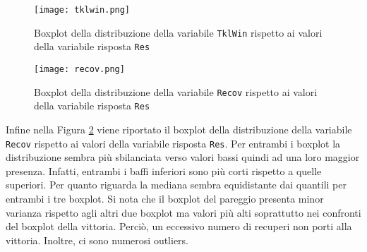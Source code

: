 \begin{figure}[htbp]
	\begin{center}
		\texttt{[image: tklwin.png]}
		\caption{Boxplot della distribuzione della variabile \texttt{TklWin} rispetto ai valori della variabile risposta \texttt{Res}} \label{fig:tkl}
	\end{center}
\end{figure}
\begin{figure}[htbp]
	\begin{center}
		\texttt{[image: recov.png]}
		\caption{Boxplot della distribuzione della variabile \texttt{Recov} rispetto ai valori della variabile risposta \texttt{Res}} \label{fig:recov}
	\end{center}
\end{figure} 
Infine nella Figura \ref{fig:recov} viene riportato il boxplot della distribuzione della variabile \texttt{Recov} rispetto ai valori della variabile risposta \texttt{Res}. Per entrambi i boxplot la distribuzione sembra più sbilanciata verso valori bassi quindi ad una loro maggior presenza. Infatti, entrambi i baffi inferiori sono più corti rispetto a quelle superiori. Per quanto riguarda la mediana sembra equidistante dai quantili per entrambi i tre boxplot. Si nota che il boxplot del pareggio presenta minor varianza rispetto agli altri due boxplot ma valori più alti soprattutto nei confronti del boxplot della vittoria. Perciò, un eccessivo numero di recuperi non porti alla vittoria. Inoltre, ci sono numerosi outliers.

